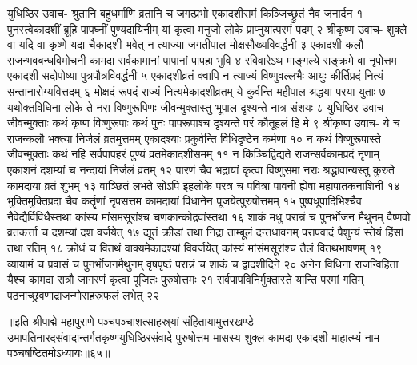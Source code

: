 युधिष्ठिर उवाच-
श्रुतानि बहुधर्माणि व्रतानि च जगत्प्रभो 
एकादशीसमं किञ्जिच्छ्रुतं नैव जनार्दन १
पुनस्त्वेकादशीं ब्रूहि पापघ्नीं पुण्यदायिनीम् 
यां कृत्वा मनुजो लोके प्राप्नुयात्परमं पदम् २
श्रीकृष्ण उवाच-
शुक्ले वा यदि वा कृष्णे यदा चैकादशी भवेत् 
न त्याज्या जगतीपाल मोक्षसौख्यविवर्द्धनी ३
एकादशी कलौ राजन्भवबन्धविमोचनी 
कामदा सर्वकामानां पापानां पापहा भुवि ४
रविवारेऽथ माङ्गल्ये सङ्क्रमे वा नृपोत्तम 
एकादशी सदोपोष्या पुत्रपौत्रविवर्द्धनी ५
एकादशीव्रतं क्वापि न त्याज्यं विष्णुवल्लभैः 
आयुः कीर्तिप्रदं नित्यं सन्तानारोग्यवित्तदम् ६
मोक्षदं रूपदं राज्यं नित्यमेकादशीव्रतम् 
ये कुर्वन्ति महीपाल श्रद्धया परया युताः ७
यथोक्तविधिना लोके ते नरा विष्णुरूपिणः  
जीवन्मुक्तास्तु भूपाल दृश्यन्ते नात्र संशयः ८
युधिष्ठिर उवाच-
जीवन्मुक्ताः कथं कृष्ण विष्णुरूपाः कथं पुनः 
पापरूपाश्च दृश्यन्ते परं कौतूहलं हि मे ९
श्रीकृष्ण उवाच-
ये च राजन्कलौ भक्त्या निर्जलं व्रतमुत्तमम् 
एकादश्याः प्रकुर्वन्ति विधिदृष्टेन कर्मणा १०
न कथं विष्णुरूपास्ते जीवन्मुक्ताः कथं नहि 
सर्वपापहरं पुण्यं व्रतमेकादशीसमम् ११
न किञ्चिद्विद्यते राजन्सर्वकामप्रदं नृणाम् 
एकाशनं दशम्यां च नन्दायां निर्जलं व्रतम् १२
पारणं चैव भद्रायां कृत्वा विष्णुसमा नराः 
श्रद्धावान्यस्तु कुरुते कामदाया व्रतं शुभम् १३
वाञ्छितं लभते सोऽपि इहलोके परत्र च 
पवित्रा पावनी ह्येषा महापातकनाशिनी १४
भुक्तिमुक्तिप्रदा चैव कर्तॄणां नृपसत्तम 
कामदायां विधानेन पूजयेत्पुरुषोत्तमम् १५
पुष्पधूपादिभिश्चैव नैवेद्यैर्विविधैस्तथा 
कांस्य मांसमसूरांश्च चणकान्कोद्रवांस्तथा १६
शाकं मधु परान्नं च पुनर्भोजन मैथुनम् 
वैष्णवो व्रतकर्त्ता च दशम्यां दश वर्जयेत् १७
द्यूतं क्रीडां तथा निद्रा ताम्बूलं दन्तधावनम् 
परापवादं पैशुन्यं स्तेयं हिंसां तथा रतिम् १८
क्रोधं च वितथं वाक्यमेकादश्यां विवर्जयेत् 
कांस्यं मांसंमसूरांश्च तैलं वितथभाषणम् १९
व्यायामं च प्रवासं च पुनर्भोजनमैथुनम् 
वृषपृष्ठं परान्नं च शाकं च द्वादशीदिने २०
अनेन विधिना राजन्विहिता यैश्च कामदा 
रात्रौ जागरणं कृत्वा पूजितः पुरुषोत्तमः २१
सर्वपापविनिर्मुक्तास्ते यान्ति परमां गतिम् 
पठनाच्छ्रवणाद्राजन्गोसहस्रफलं लभेत् २२

॥इति श्रीपाद्मे महापुराणे पञ्चपञ्चाशत्साहस्र्यां संहितायामुत्तरखण्डे उमापतिनारदसंवादान्तर्गतकृष्णयुधिष्ठिरसंवादे पुरुषोत्तम-मासस्य शुक्ल-कामदा-एकादशी-माहात्म्यं नाम पञ्चषष्टितमोऽध्यायः॥६५॥


